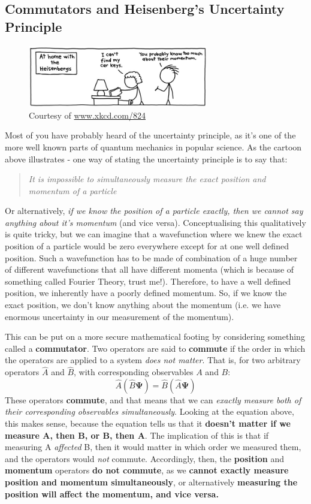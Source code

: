 \documentclass{memoir}[11pt,oneside,a4paper,openany]
\newcommand{\wf}{\ensuremath{\bm{\Psi}}\xspace}
\begin{document}
\subsection{Commutators and Heisenberg's Uncertainty Principle}
\begin{figure}[h!]
	\centering
	\includegraphics[width=0.7\textwidth]{keys-heis.jpg}
	\caption{Courtesy of \url{www.xkcd.com/824}}
\end{figure}

Most of you have probably heard of the uncertainty principle, as it's one of the more well known parts of quantum mechanics in popular science. As the cartoon above illustrates - one way of stating the uncertainty principle is to say that:
\begin{quote}
	\textit{It is impossible to simultaneously measure the exact position and momentum of a particle}
\end{quote}
Or alternatively, \emph{if we know the position of a particle exactly, then we cannot say anything about it's momentum} (and vice versa). Conceptualising this qualitatively is quite tricky, but we can imagine that a wavefunction where we knew the exact position of a particle would be zero everywhere except for at one well defined position. Such a wavefunction has to be made of combination of a huge number of different wavefunctions that all have different momenta (which is because of something called Fourier Theory, trust me!). Therefore, to have a well defined position, we inherently have a poorly defined momentum. So, if we know the exact position, we don't know anything about the momentum (i.e. we have enormous uncertainty in our measurement of the momentum).

This can be put on a more secure mathematical footing by considering something called a \textbf{commutator}. Two operators are said to \textbf{commute} if the order in which the operators are applied to a system \emph{does not matter}. That is, for two arbitrary operators $\hat{A}$ and $\hat{B}$, with corresponding observables $A$ and $B$:
\begin{equation}
	\hat{A}(\hat{B}\wf) = \hat{B}(\hat{A}\wf)
\end{equation}
These operators \textbf{commute}, and that means that we can \emph{exactly measure both of their corresponding observables simultaneously}. Looking at the equation above, this makes sense, because the equation tells us that it \textbf{doesn't matter if we measure A, then B, or B, then A}. The implication of this is that if measuring A \emph{affected} B, then it would matter in which order we measured them, and the operators would \emph{not} commute. Accordingly, then, the \textbf{position} and \textbf{momentum} operators \textbf{do not commute}, as we \textbf{cannot exactly measure position and momentum simultaneously}, or alternatively \textbf{measuring the position will affect the momentum, and vice versa.} 
\end{document}
